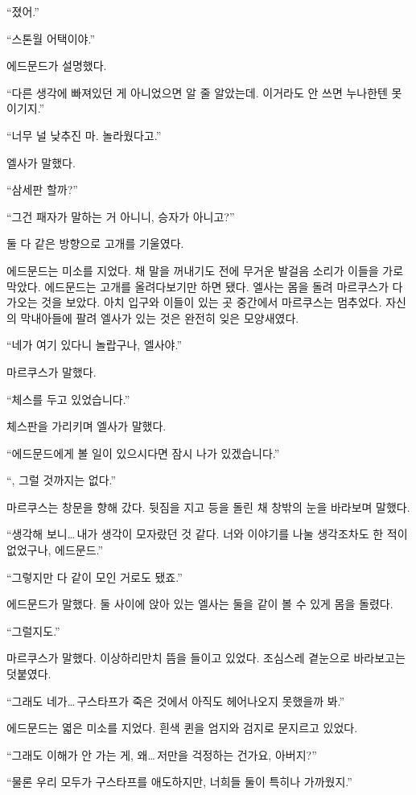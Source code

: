 `` 졌어.''

``스톤월 어택이야.''

에드문드가 설명했다.

``다른 생각에 빠져있던 게 아니었으면 알 줄 알았는데. 이거라도 안 쓰면 누나한텐 못 이기지.''

``너무 널 낮추진 마. 놀라웠다고.''

엘사가 말했다.

``삼세판 할까?''

``그건 패자가 말하는 거 아니니, 승자가 아니고?''

둘 다 같은 방향으로 고개를 기울였다.

에드문드는 미소를 지었다. 채 말을 꺼내기도 전에 무거운 발걸음 소리가 이들을 가로막았다. 에드문드는 고개를 올려다보기만 하면 됐다. 엘사는 몸을 돌려 마르쿠스가 다가오는 것을 보았다. 아치 입구와 이들이 있는 곳 중간에서 마르쿠스는 멈추었다. 자신의 막내아들에 팔려 엘사가 있는 것은 완전히 잊은 모양새였다.

``네가 여기 있다니 놀랍구나, 엘사야.''

마르쿠스가 말했다.

``체스를 두고 있었습니다.''

체스판을 가리키며 엘사가 말했다.

``에드문드에게 볼 일이 있으시다면 잠시 나가 있겠습니다.''

``, 그럴 것까지는 없다.''

마르쿠스는 창문을 향해 갔다. 뒷짐을 지고 등을 돌린 채 창밖의 눈을 바라보며 말했다.

``생각해 보니\ldots\,내가 생각이 모자랐던 것 같다. 너와 이야기를 나눌 생각조차도 한 적이 없었구나, 에드문드.''

``그렇지만 다 같이 모인 거로도 됐죠.''

에드문드가 말했다. 둘 사이에 앉아 있는 엘사는 둘을 같이 볼 수 있게 몸을 돌렸다.

``그럴지도.''

마르쿠스가 말했다. 이상하리만치 뜸을 들이고 있었다. 조심스레 곁눈으로 바라보고는 덧붙였다.

``그래도 네가\ldots\,구스타프가 죽은 것에서 아직도 헤어나오지 못했을까 봐.''

에드문드는 엷은 미소를 지었다. 흰색 퀸을 엄지와 검지로 문지르고 있었다.

``그래도 이해가 안 가는 게, 왜\ldots\,저만을 걱정하는 건가요, 아버지?''

``물론 우리 모두가 구스타프를 애도하지만, 너희들 둘이 특히나 가까웠지.''

